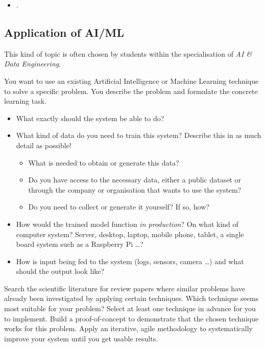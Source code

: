 \begin{itemize}
	\item {} \autocite{Vermeersch2024}.
\end{itemize}

\subsection{Application of AI/ML}%
\label{ssec:thesis_type_application_of_AI_ML}

This kind of topic is often chosen by students within the specialisation of \emph{AI \& Data Engineering}.

You want to use an existing Artificial Intelligence or Machine Learning technique to solve a specific problem. You describe the problem and formulate the concrete learning task. 
\begin{itemize}
	\item What exactly should the system be able to do?
	\item What kind of data do you need to train this system? Describe this in as much detail as possible!
	\begin{itemize}
		\item What is needed to obtain or generate this data? 
		\item Do you have access to the necessary data, either a public dataset or through the company or organisation that wants to use the system?
		\item Do you need to collect or generate it yourself? If so, how? 
	\end{itemize}
	\item How would the trained model function \textit{in production}? On what kind of computer system? Server, desktop, laptop, mobile phone, tablet, a single board system such as a Raspberry Pi {\ldots}?
	\item How is input being fed to the system (logs, sensors, camera {\ldots}) and what should the output look like?
\end{itemize} 


Search the scientific literature for review papers where similar problems have already been investigated by applying certain techniques. Which technique seems most suitable for your problem? Select at least one technique in advance for you to implement. Build a proof-of-concept to demonstrate that the chosen technique works for this problem. Apply an iterative, agile methodology to systematically improve your system until you get usable results.

